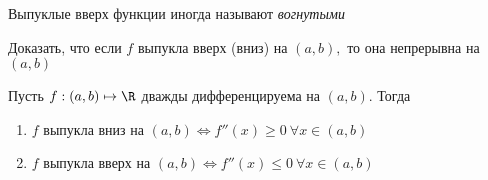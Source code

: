 \begin{note}
	Выпуклые вверх функции иногда называют \textit{вогнутыми}
\end{note}

\begin{problem}
	Доказать, что если $f$ выпукла вверх (вниз) на $(a, b),$ то она непрерывна на $(a, b)$ 
\end{problem}

\begin{theorem}
	Пусть $f:(a, b) \mapsto \R$ дважды дифференцируема на $(a,b)$. Тогда
	\begin{enumerate}
		\item $f$ выпукла вниз на $(a, b) \Leftrightarrow f''(x) \geq 0 \ \forall x\in (a, b)$
		\item $f$ выпукла вверх на $(a, b) \Leftrightarrow f''(x) \leq 0 \ \forall x\in (a, b)$
	\end{enumerate}
\end{theorem}
